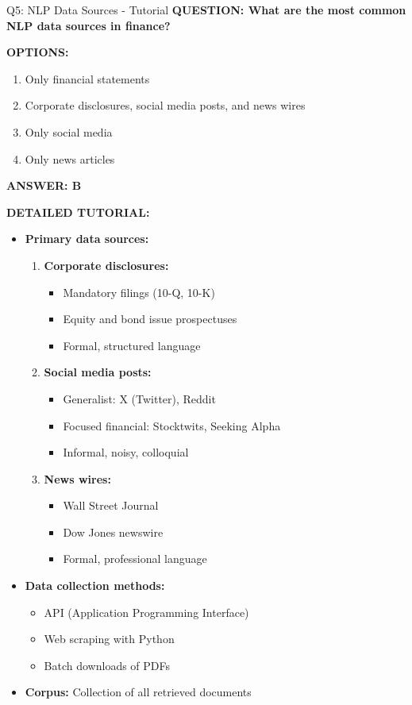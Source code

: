 \documentclass[8pt]{beamer}
\begin{document}
	\begin{frame}{Q5: NLP Data Sources - Tutorial}
		\fontsize{6.5}{7.5}\selectfont
		\textbf{QUESTION: What are the most common NLP data sources in finance?}
		
		\vspace{0.1cm}
		\textbf{OPTIONS:}
		\begin{enumerate}
			\item Only financial statements
			\item Corporate disclosures, social media posts, and news wires
			\item Only social media
			\item Only news articles
		\end{enumerate}
		
		\vspace{0.1cm}
		\textcolor{myblue}{\textbf{ANSWER: B}}
		
		\vspace{0.1cm}
		\textbf{DETAILED TUTORIAL:}
		\begin{itemize}
			\item \textbf{Primary data sources:}
			\begin{enumerate}
				\item \textbf{Corporate disclosures:}
				\begin{itemize}
					\item Mandatory filings (10-Q, 10-K)
					\item Equity and bond issue prospectuses
					\item Formal, structured language
				\end{itemize}
				\item \textbf{Social media posts:}
				\begin{itemize}
					\item Generalist: X (Twitter), Reddit
					\item Focused financial: Stocktwits, Seeking Alpha
					\item Informal, noisy, colloquial
				\end{itemize}
				\item \textbf{News wires:}
				\begin{itemize}
					\item Wall Street Journal
					\item Dow Jones newswire
					\item Formal, professional language
				\end{itemize}
			\end{enumerate}
			\item \textbf{Data collection methods:}
			\begin{itemize}
				\item API (Application Programming Interface)
				\item Web scraping with Python
				\item Batch downloads of PDFs
			\end{itemize}
			\item \textbf{Corpus:} Collection of all retrieved documents
		\end{itemize}
		

\end{frame}
\end{document}
